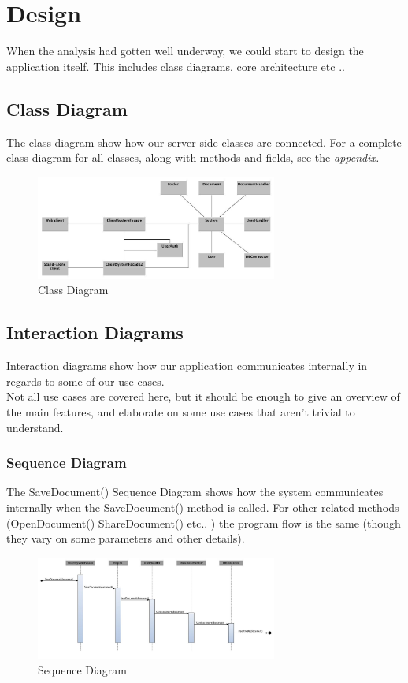 \documentclass[11pt]{article}
\begin{document}
\section{Design}
\label{sec-3}
When the analysis had gotten well underway, we could start to design the application itself. This includes class diagrams, core architecture etc ..
\subsection{Class Diagram}
\label{sec-3-1}
The class diagram show how our server side classes are connected. For a complete class diagram for all classes, along with methods and fields, see the \emph{appendix.}
\begin{figure}[H]
  		\centering
    	\includegraphics[width=300px]{images/LatestClassDiagram.jpg}
    	\caption{Class Diagram}
\end{figure}
\subsection{Interaction Diagrams}
\label{sec-3-2}
Interaction diagrams show how our application communicates internally in regards to some of our use cases. \\
Not all use cases are covered here, but it should be enough to give an overview of the main features, and elaborate on some use cases that aren't trivial to understand.
\subsubsection{Sequence Diagram}
\label{sec-3-2-1}
The SaveDocument() Sequence Diagram shows how the system communicates internally when the SaveDocument() method is called.
For other related methods (OpenDocument() ShareDocument() etc.. ) the program flow is the same (though they vary on some parameters and other details).
\begin{figure}[H]
  		\centering
    	\includegraphics[width=300px]{images/SequenceDiagram_SaveDocument.jpg}
    	\caption{Sequence Diagram}
\end{figure}
\end{document}

